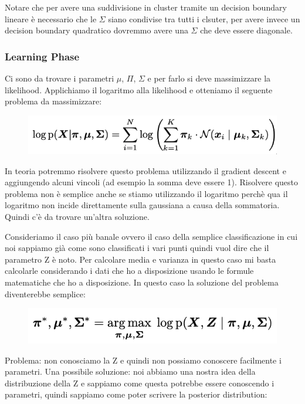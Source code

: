\documentclass[14pt]{extreport}
\begin{document}
Notare che per avere una suddivisione in cluster tramite un decision boundary lineare è necessario che le $\Sigma$ siano condivise tra tutti i clsuter, per avere invece un 
decision boundary quadratico dovremmo avere una $\Sigma$ che deve essere diagonale.

\subsubsection{Learning Phase}

Ci sono da trovare i parametri $\mu$, $\Pi$, $\Sigma$ e per farlo si deve massimizzare la likelihood.
Applichiamo il logaritmo alla likelihood e otteniamo il seguente problema da massimizzare:


\begin{figure}[H] 
\centering
\includegraphics[width=0.7\linewidth]{548.jpeg}
\end{figure}

In teoria potremmo risolvere questo problema utilizzando il gradient descent e aggiungendo alcuni vincoli (ad esempio la somma deve essere 1).
Risolvere questo problema non è semplice anche se stiamo utilizzando il logaritmo perchè qua il logaritmo non incide direttamente sulla gaussiana a causa 
della sommatoria. Quindi c'è da trovare un'altra soluzione.

Consideriamo il caso più banale ovvero il caso della semplice classificazione in cui noi sappiamo già come sono classificati i vari punti quindi vuol dire
che il parametro Z è noto. Per calcolare media e varianza in questo caso mi basta calcolarle considerando i dati che ho a disposizione usando le formule 
matematiche che ho a disposizione.
In questo caso la soluzione del problema diventerebbe semplice:

\begin{figure}[H] 
\centering
\includegraphics[width=0.7\linewidth]{549.jpeg}
\end{figure}

Problema: non conosciamo la Z e quindi non possiamo conoscere facilmente i parametri. 
Una possibile soluzione: noi abbiamo una nostra idea della distribuzione della Z e sappiamo come questa potrebbe essere conoscendo i parametri, quindi 
sappiamo come poter scrivere la posterior distribution:
\end{document}

